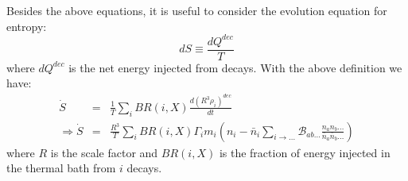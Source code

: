\documentclass[preprint,notoc]{JHEP3}
\def\to{\rightarrow}
\def\To{\Rightarrow}
\def\to{\rightarrow}
\begin{document}
Besides the above equations, it is useful to consider the evolution equation for entropy:
\begin{equation}
dS \equiv \frac{dQ^{dec}}{T}
\end{equation}
where $dQ^{dec}$ is the net energy injected from decays.
With the above definition we have:
\begin{eqnarray}
\dot{S} & = & \frac{1}{T}\sum_i BR(i,X)
\frac{d\left(R^3 \rho_i\right)^{dec}}{dt}  \nonumber \\
\To \dot{S} & = & \frac{R^3}{T}\sum_i BR(i,X)
\Gamma_i m_i\left(n_i - \bar{n}_i \sum_{i\to\ldots} \mathcal{B}_{ab\ldots} \frac{n_a n_b\ldots}{\bar{n}_a
\bar{n}_b\ldots} \right) \label{Seq}
\end{eqnarray}
where $R$ is the scale factor and $BR(i,X)$ is the fraction of energy injected
in the thermal bath from $i$ decays.
 
\end{document}
